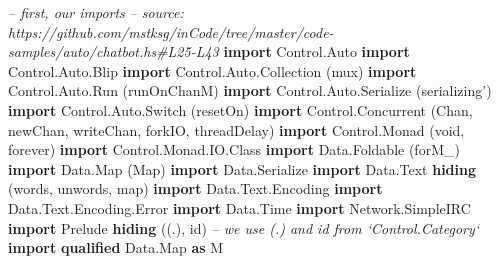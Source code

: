 \documentclass[]{article}
\newenvironment{Shaded}{\begin{snugshade}}{\end{snugshade}}
\newcommand{\CommentTok}[1]{\textcolor[rgb]{0.56,0.35,0.01}{\textit{#1}}}
\newcommand{\DataTypeTok}[1]{\textcolor[rgb]{0.13,0.29,0.53}{#1}}
\newcommand{\KeywordTok}[1]{\textcolor[rgb]{0.13,0.29,0.53}{\textbf{#1}}}
\newcommand{\NormalTok}[1]{#1}
\begin{document}
\begin{Shaded}
\begin{Highlighting}[]
\CommentTok{-- first, our imports}
\CommentTok{-- source: https://github.com/mstksg/inCode/tree/master/code-samples/auto/chatbot.hs#L25-L43}
\KeywordTok{import} \DataTypeTok{Control.Auto}
\KeywordTok{import} \DataTypeTok{Control.Auto.Blip}
\KeywordTok{import} \DataTypeTok{Control.Auto.Collection}\NormalTok{  (mux)}
\KeywordTok{import} \DataTypeTok{Control.Auto.Run}\NormalTok{         (runOnChanM)}
\KeywordTok{import} \DataTypeTok{Control.Auto.Serialize}\NormalTok{   (serializing')}
\KeywordTok{import} \DataTypeTok{Control.Auto.Switch}\NormalTok{      (resetOn)}
\KeywordTok{import} \DataTypeTok{Control.Concurrent}\NormalTok{       (}\DataTypeTok{Chan}\NormalTok{, newChan, writeChan, forkIO, threadDelay)}
\KeywordTok{import} \DataTypeTok{Control.Monad}\NormalTok{            (void, forever)}
\KeywordTok{import} \DataTypeTok{Control.Monad.IO.Class}
\KeywordTok{import} \DataTypeTok{Data.Foldable}\NormalTok{            (forM_)}
\KeywordTok{import} \DataTypeTok{Data.Map}\NormalTok{                 (}\DataTypeTok{Map}\NormalTok{)}
\KeywordTok{import} \DataTypeTok{Data.Serialize}
\KeywordTok{import} \DataTypeTok{Data.Text} \KeywordTok{hiding}\NormalTok{         (words, unwords, map)}
\KeywordTok{import} \DataTypeTok{Data.Text.Encoding}
\KeywordTok{import} \DataTypeTok{Data.Text.Encoding.Error}
\KeywordTok{import} \DataTypeTok{Data.Time}
\KeywordTok{import} \DataTypeTok{Network.SimpleIRC}
\KeywordTok{import} \DataTypeTok{Prelude} \KeywordTok{hiding}\NormalTok{           ((.), id)   }\CommentTok{-- we use (.) and id from `Control.Category`}
\KeywordTok{import} \KeywordTok{qualified} \DataTypeTok{Data.Map}       \KeywordTok{as} \DataTypeTok{M}
\end{Highlighting}
\end{Shaded}
\end{document}
